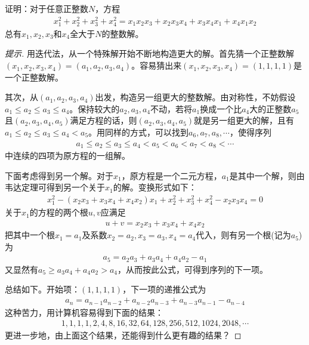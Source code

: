 \begin{example}[Putnam 1988]
  证明：对于任意正整数$N$，方程
  \begin{align*}
    x_1^2+x_2^2+x_3^2+x_4^2=x_1x_2x_3+x_2x_3x_4+x_3x_4x_1 + x_4x_1x_2
  \end{align*}
  总有$x_1,x_2,x_3$和$x_4$全大于$N$的整数解。
\end{example}
\begin{proof}[提示]用迭代法，从一个特殊解开始不断地构造更大的解。首先猜一个正整数解$(x_1,x_2,x_3,x_4)=(a_1,a_2,a_3,a_4)$。容易猜出来$(x_1,x_2,x_3,x_4)=(1,1,1,1)$是一个正整数解。

  其次，从$(a_1,a_2,a_3,a_4)$出发，构造另一组更大的整数解。由对称性，不妨假设$a_1\le a_2\le a_3\le a_4$。保持较大的$a_2,a_3,a_4$不动，若将$a_1$换成一个比$a_4$大的正整数$a_5$且$(a_2,a_3,a_4,a_5)$满足方程的话，则$\left(a_2, a_3,a_4, a_5\right)$就是另一组更大的解，且有
  $a_1\le a_2\le a_3\le a_4 < a_5$。用同样的方式，可以找到$a_6, a_7, a_8, \cdots$，使得序列
  \begin{align*}
    a_1\le a_2\le a_3\le a_4 < a_5 < a_6 < a_7 < a_8 < \cdots
  \end{align*}
  中连续的四项为原方程的一组解。

  下面考虑得到另一个解。对于$x_1$，原方程是一个二元方程，$a_1$是其中一个解，则由韦达定理可得到另一个关于$x_1$的解。变换形式如下：
  \begin{align*}
    x_1^2 - (x_2x_3+x_3x_4+x_4x_2)x_1 + x_2^2 + x_3^2 + x_4^2 - x_2x_3x_4=0
  \end{align*}
  关于$x_1$的方程的两个根$u, v$应满足
  \begin{align*}
    u + v = x_2x_3+x_3x_4+x_4x_2
  \end{align*}
  把其中一个根$x_1=a_1$及系数$x_2=a_2, x_3=a_3, x_4=a_4$代入，则有另一个根(记为$a_5$)为
  \begin{align*}
    a_5 = a_2a_3 + a_3a_4 + a_4a_2 - a_1
  \end{align*}
  又显然有$a_5  \ge a_3a_4 + a_4a_2 > a_4$，从而按此公式，可得到序列的下一项。

  总结如下。开始项：$(1,1,1,1)$，下一项的递推公式为
  \begin{align*}
    a_n = %
    a_{n-1}a_{n-2} + a_{n-2}a_{n-3} + a_{n-3}a_{n-1} - a_{n-4}
  \end{align*}
  这种苦力，用计算机容易得到下面的结果：
  \begin{align*}
    1,1,1,1,2, 4, 8, 16, 32, 64, 128, 256, 512, 1024, 2048,\cdots
  \end{align*}
  更进一步地，由上面这个结果，还能得到什么更有趣的结果？
\end{proof}

